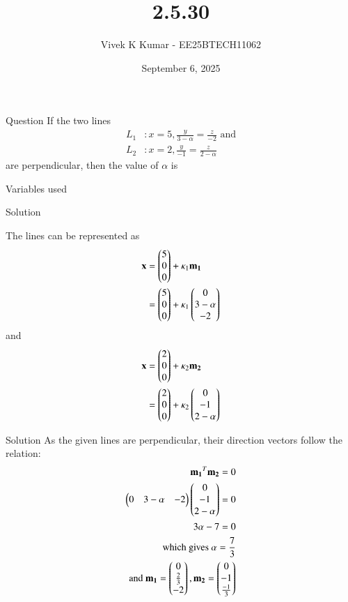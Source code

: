 \documentclass{beamer}
\title 
{2.5.30}
\date{September 6, 2025}
\author 
{Vivek K Kumar - EE25BTECH11062}
\begin{document}
\frame{\titlepage}
\begin{frame}{Question}
If the two lines 
\begin{align}
    L_1 &: x=5, \frac{y}{3-\alpha} = \frac{z}{-2} \text{ and} \\
    L_2 &: x=2, \frac{y}{-1} = \frac{z}{2-\alpha}
\end{align}
are perpendicular, then the value of $\alpha$ is \underline{\hspace{0.1\columnwidth}}
\\
\end{frame}



\begin{frame}{Variables used}
\begin{table}[H]    
  \centering
  
  \caption{Variables Used}
  \label{tab:1.6.12}
\end{table}

\end{frame}

\begin{frame}{Solution}

The lines can be represented as\\
\begin{align}
\mathbf{x} &= \begin{pmatrix}5\\0\\0\end{pmatrix} + \kappa_1\mathbf{m_1}\\
           &= \begin{pmatrix}5\\0\\0\end{pmatrix} + \kappa_1\begin{pmatrix}0\\3-\alpha\\-2\end{pmatrix}
\end{align}
and 
\begin{align}
\mathbf{x} &= \begin{pmatrix}2\\0\\0\end{pmatrix} + \kappa_2\mathbf{m_2}\\
           &= \begin{pmatrix}2\\0\\0\end{pmatrix} + \kappa_2\begin{pmatrix}0\\-1\\2-\alpha\end{pmatrix}
\end{align}

\end{frame}
\begin{frame}{Solution}
As the given lines are perpendicular, their direction vectors follow the relation: 
\begin{align}
    \mathbf{m_1}^T\mathbf{m_2} = 0 \\
    \begin{pmatrix}0&3-\alpha&-2\end{pmatrix}\begin{pmatrix}0\\-1\\2-\alpha\end{pmatrix} = 0\\
    3\alpha - 7 = 0\\
    \text{which gives } \alpha = \frac{7}{3}\\
    \text{and } \mathbf{m_1} = \begin{pmatrix}0 \\ \frac{2}{3} \\ -2\end{pmatrix} , \mathbf{m_2} = \begin{pmatrix}0 \\ -1 \\ \frac{-1}{3}\end{pmatrix}
\end{align}
\end{frame}
\end{document}
